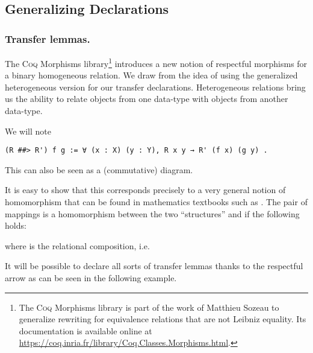 \documentclass{llncs}
\begin{document}
\subsection{Generalizing Declarations}

\label{subsec:gen_decl}

\subsubsection{Transfer lemmas.}

The \textsc{Coq} Morphisms library\footnote{The \textsc{Coq} Morphisms library is part of the work
of Matthieu Sozeau \cite{Sozeau2010}
to generalize rewriting for equivalence relations that are not Leibniz equality.
Its documentation is available online at \url{https://coq.inria.fr/library/Coq.Classes.Morphisms.html}.}
introduces a new notion of respectful morphisms for a binary homogeneous relation.
We draw from \cite{Cohen2013} the idea of using the generalized heterogeneous version for our transfer
declarations.
Heterogeneous relations bring us the ability to relate objects from one data-type with
objects from another data-type.

We will note
\begin{verbatim}
(R ##> R') f g := ∀ (x : X) (y : Y), R x y → R' (f x) (g y) .\end{verbatim}
This can also be seen as a (commutative) diagram.



It is easy to show that this corresponds precisely to a very general notion of homomorphism
that can be found in mathematics textbooks such as \cite[Ch. 5.7]{schmidt2011relational}.
The pair of mappings  is a homomorphism
between the two ``structures'' 
and  if the following holds:

where  is the relational composition, i.e.



It will be possible to declare all sorts of transfer lemmas thanks
to the respectful arrow as can be seen in the following example.
\end{document}
